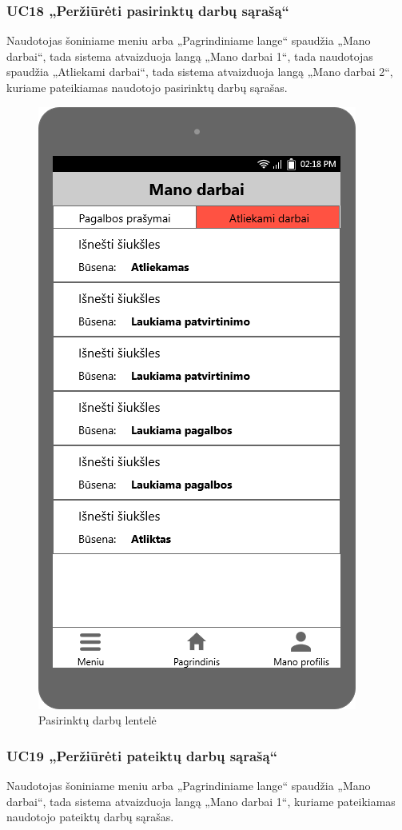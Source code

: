 \documentclass{VUMIFPSbakalaurinis}
\begin{document}
\subsubsection{UC18 „Peržiūrėti pasirinktų darbų sąrašą“}
Naudotojas šoniniame meniu arba „Pagrindiniame lange“ spaudžia „Mano darbai“, tada sistema atvaizduoja langą „Mano darbai 1“, tada naudotojas spaudžia „Atliekami darbai“, tada sistema atvaizduoja langą „Mano darbai 2“, kuriame pateikiamas naudotojo pasirinktų darbų sąrašas.

\begin{figure}[H]
	\centering
	\includegraphics[scale=0.4]{img/ScreenShots/05-Mano-darbai1}
	\caption{Pasirinktų darbų lentelė}
	\label{img:requested jobs table}
\end{figure}
\subsubsection{UC19 „Peržiūrėti pateiktų darbų sąrašą“}
Naudotojas šoniniame meniu arba „Pagrindiniame lange“ spaudžia „Mano darbai“, tada sistema atvaizduoja langą „Mano darbai 1“, kuriame pateikiamas naudotojo pateiktų darbų sąrašas.
\end{document}
